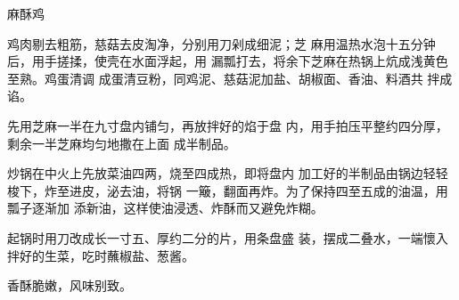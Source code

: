 \begin{recipe}{麻酥鸡}

\ingredients



\cooking

\step 	鸡肉剔去粗筋，慈菇去皮淘净，分别用刀剁成细泥；芝 麻用温热水泡十五分钟后，用手搓揉，使壳在水面浮起，用 漏瓢打去，将余下芝麻在热锅上炕成浅黄色至熟。鸡蛋清调 成蛋清豆粉，同鸡泥、慈菇泥加盐、胡椒面、香油、料酒共 拌成谄。

\step 	先用芝麻一半在九寸盘内铺匀，再放拌好的焰于盘 内，用手拍压平整约四分厚，剩余一半芝麻均匀地撒在上面 成半制品。

\step 炒锅在中火上先放菜油四两，烧至四成热，即将盘内 加工好的半制品由锅边轻轻梭下，炸至进皮，泌去油，将锅 一簸，翻面再炸。为了保持四至五成的油温，用瓢子逐渐加 添新油，这样使油浸透、炸酥而又避免炸糊。

\step 起锅时用刀改成长一寸五、厚约二分的片，用条盘盛 装，摆成二叠水，一端懷入拌好的生菜，吃时蘸椒盐、葱酱。

\notes

香酥脆嫩，风味别致。

\end{recipe}

